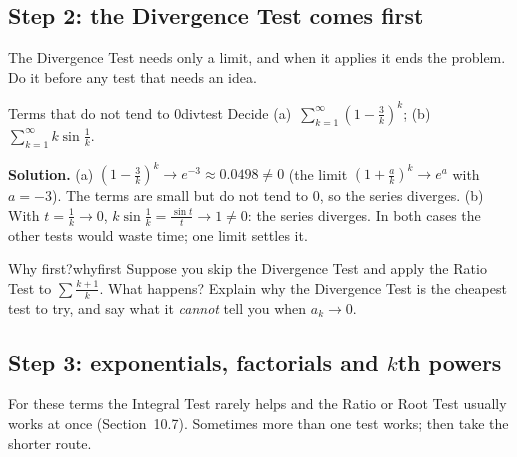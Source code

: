 \documentclass[11pt]{article}
\begin{document}
\subsection*{Step 2: the Divergence Test comes first}

The Divergence Test needs only a limit, and when it applies it ends the problem. Do it before any test that needs an idea.

\begin{exmp}{Terms that do not tend to $0$}{divtest}
Decide (a)~$\displaystyle\sum_{k=1}^\infty\left(1-\frac3k\right)^k$; \quad (b)~$\displaystyle\sum_{k=1}^\infty k\sin\frac1k$.

\textbf{Solution.} (a) $\left(1-\frac3k\right)^k\to e^{-3}\approx0.0498\ne0$ (the limit $\left(1+\frac ak\right)^k\to e^a$ with $a=-3$). The terms are small but do not tend to $0$, so the series diverges. (b) With $t=\frac1k\to0$, $k\sin\frac1k=\frac{\sin t}t\to1\ne0$: the series diverges. In both cases the other tests would waste time; one limit settles it.
\end{exmp}

\begin{think}{Why first?}{whyfirst}
Suppose you skip the Divergence Test and apply the Ratio Test to $\sum\frac{k+1}{k}$. What happens? Explain why the Divergence Test is the cheapest test to try, and say what it \emph{cannot} tell you when $a_k\to0$.
\end{think}

\subsection*{Step 3: exponentials, factorials and $k$th powers}

For these terms the Integral Test rarely helps and the Ratio or Root Test usually works at once (Section~10.7). Sometimes more than one test works; then take the shorter route.
\end{document}
